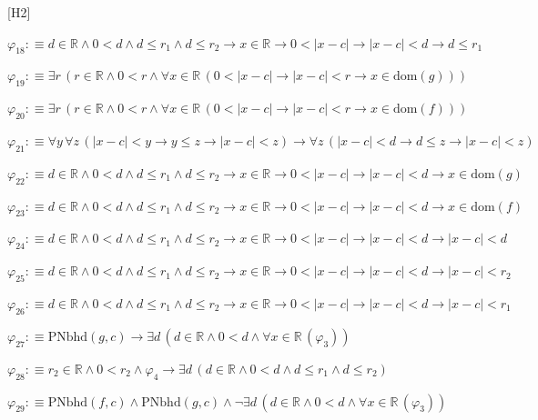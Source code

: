 \begin{fullproof}{[H2]}
\begin{abbrevlist}
\item $\varphi_{18} :\equiv d \in \mathbb{R} \land 0 < d \land d \leq r_{1} \land d \leq r_{2} \to x \in \mathbb{R} \to 0 < \lvert x - c \rvert \to \lvert x - c \rvert < d \to d \leq r_{1}$
\item $\varphi_{19} :\equiv \exists r\,(r \in \mathbb{R} \land 0 < r \land \forall x \in \mathbb{R}\,(0 < \lvert x - c \rvert \to \lvert x - c \rvert < r \to x \in \mathrm{dom}(g)))$
\item $\varphi_{20} :\equiv \exists r\,(r \in \mathbb{R} \land 0 < r \land \forall x \in \mathbb{R}\,(0 < \lvert x - c \rvert \to \lvert x - c \rvert < r \to x \in \mathrm{dom}(f)))$
\item $\varphi_{21} :\equiv \forall y\,\forall z\,(\lvert x - c \rvert < y \to y \leq z \to \lvert x - c \rvert < z) \to \forall z\,(\lvert x - c \rvert < d \to d \leq z \to \lvert x - c \rvert < z)$
\item $\varphi_{22} :\equiv d \in \mathbb{R} \land 0 < d \land d \leq r_{1} \land d \leq r_{2} \to x \in \mathbb{R} \to 0 < \lvert x - c \rvert \to \lvert x - c \rvert < d \to x \in \mathrm{dom}(g)$
\item $\varphi_{23} :\equiv d \in \mathbb{R} \land 0 < d \land d \leq r_{1} \land d \leq r_{2} \to x \in \mathbb{R} \to 0 < \lvert x - c \rvert \to \lvert x - c \rvert < d \to x \in \mathrm{dom}(f)$
\item $\varphi_{24} :\equiv d \in \mathbb{R} \land 0 < d \land d \leq r_{1} \land d \leq r_{2} \to x \in \mathbb{R} \to 0 < \lvert x - c \rvert \to \lvert x - c \rvert < d \to \lvert x - c \rvert < d$
\item $\varphi_{25} :\equiv d \in \mathbb{R} \land 0 < d \land d \leq r_{1} \land d \leq r_{2} \to x \in \mathbb{R} \to 0 < \lvert x - c \rvert \to \lvert x - c \rvert < d \to \lvert x - c \rvert < r_{2}$
\item $\varphi_{26} :\equiv d \in \mathbb{R} \land 0 < d \land d \leq r_{1} \land d \leq r_{2} \to x \in \mathbb{R} \to 0 < \lvert x - c \rvert \to \lvert x - c \rvert < d \to \lvert x - c \rvert < r_{1}$
\item $\varphi_{27} :\equiv \mathrm{PNbhd}(g,c) \to \exists d\,(d \in \mathbb{R} \land 0 < d \land \forall x \in \mathbb{R}\,(\varphi_{3}))$
\item $\varphi_{28} :\equiv r_{2} \in \mathbb{R} \land 0 < r_{2} \land \varphi_{4} \to \exists d\,(d \in \mathbb{R} \land 0 < d \land d \leq r_{1} \land d \leq r_{2})$
\item $\varphi_{29} :\equiv \mathrm{PNbhd}(f,c) \land \mathrm{PNbhd}(g,c) \land \neg \exists d\,(d \in \mathbb{R} \land 0 < d \land \forall x \in \mathbb{R}\,(\varphi_{3}))$

\end{abbrevlist}
\end{fullproof}
